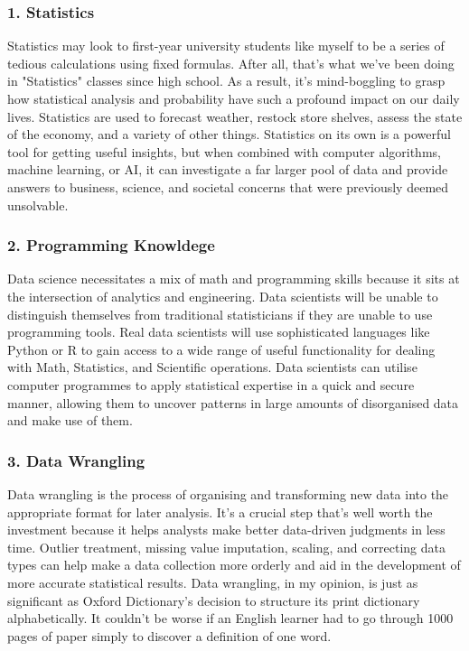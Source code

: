 \documentclass[a4paper, 11pt]{report}
\begin{document}
    \subsubsection{1. Statistics}
    Statistics may look to first-year university students like myself to be a series of tedious calculations using fixed formulas. After all, that's what we've been doing in "Statistics" classes since high school. As a result, it's mind-boggling to grasp how statistical analysis and probability have such a profound impact on our daily lives. Statistics are used to forecast weather, restock store shelves, assess the state of the economy, and a variety of other things.\cite{isaac1} Statistics on its own is a powerful tool for getting useful insights, but when combined with computer algorithms, machine learning, or AI, it can investigate a far larger pool of data and provide answers to business, science, and societal concerns that were previously deemed unsolvable.\cite{isaac2}

    \subsubsection{2. Programming Knowldege}
    Data science necessitates a mix of math and programming skills because it sits at the intersection of analytics and engineering. Data scientists will be unable to distinguish themselves from traditional statisticians if they are unable to use programming tools. Real data scientists will use sophisticated languages like Python or R to gain access to a wide range of useful functionality for dealing with Math, Statistics, and Scientific operations.\cite{isaac3} Data scientists can utilise computer programmes to apply statistical expertise in a quick and secure manner, allowing them to uncover patterns in large amounts of disorganised data and make use of them.\cite{isaac1}

    \subsubsection{3. Data Wrangling}
    Data wrangling is the process of organising and transforming new data into the appropriate format for later analysis. It's a crucial step that's well worth the investment because it helps analysts make better data-driven judgments in less time. Outlier treatment, missing value imputation, scaling, and correcting data types can help make a data collection more orderly and aid in the development of more accurate statistical results.\cite{isaac4} Data wrangling, in my opinion, is just as significant as Oxford Dictionary's decision to structure its print dictionary alphabetically. It couldn't be worse if an English learner had to go through 1000 pages of paper simply to discover a definition of one word. 
\end{document}

